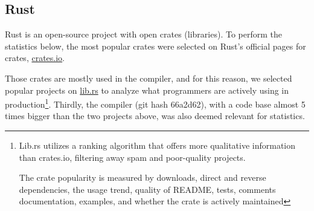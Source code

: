 \documentclass[nomenclature, english, bibtex]{kththesis}
\newcommand{\inlinecode}[1]{\texttt{#1}}
\begin{document}

\subsection{Rust}

Rust is an open-source project with open crates (libraries). To perform the statistics below, the most popular crates were selected on Rust's official pages for crates, \href{crates.io}{crates.io}. 

Those crates are mostly used in the compiler, and for this reason, we selected popular projects on \href{lib.rs}{lib.rs} to analyze what programmers are actively using in production\footnote{Lib.rs utilizes a ranking algorithm that offers more qualitative information than crates.io, filtering away spam and poor-quality projects. 

The crate popularity is measured by downloads, direct and reverse dependencies, the usage trend, quality of README, tests, comments documentation, examples, and whether the crate is actively maintained}.
Thirdly, the compiler (git hash 66a2d62), with a code base almost 5 times bigger than the two projects above, was also deemed relevant for statistics.
\end{document}
